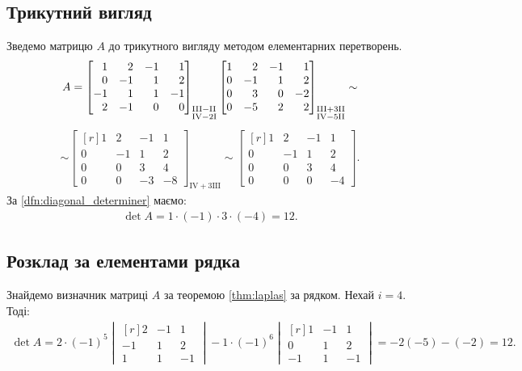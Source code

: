 \subsection{Трикутний вигляд}
\solving
Зведемо матрицю \(A\) до трикутного вигляду методом елементарних перетворень.
\begin{gather}
		A=\begin{bmatrix*}[r]
		1&2&-1&1\\
		0&-1&1&2\\
		-1&1&1&-1\\
		2&-1&0&0
	\end{bmatrix*}_{\substack{\mathrm{III-II}\hfill\\\mathrm{IV-2I}\hfill}}\begin{bmatrix*}[r]
	1&2&-1&1\\
	0&-1&1&2\\
	0&3&0&-2\\
	0&-5&2&2
\end{bmatrix*}_{\substack{\mathrm{III+3II}\hfill\\\mathrm{IV-5II}}}\sim
\end{gather}
\begin{gather}
\sim\begin{bmatrix*}[r]
1&2&-1&1\\
0&-1&1&2\\
0&0&3&4\\
0&0&-3&-8
\end{bmatrix*}_{\mathrm{IV+3III}}\sim\begin{bmatrix*}[r]
1&2&-1&1\\
0&-1&1&2\\
0&0&3&4\\
0&0&0&-4
\end{bmatrix*}.
\end{gather}
За \cref{dfn:diagonal_determiner} маємо:
\begin{gather}
	\det A =1\cdot (-1)\cdot 3\cdot (-4)=12.
\end{gather}
\subsection{Розклад за елементами рядка}
\solving
Знайдемо визначник матриці \(A\) за теоремою \ref{thm:laplas} за рядком. Нехай \(i=4\). Тоді:
\begin{gather}
	\det A = 2\cdot (-1)^5\begin{vmatrix*}[r]
		2&-1&1\\
		-1&1&2\\
		1&1&-1
	\end{vmatrix*}-1\cdot(-1)^6\begin{vmatrix*}[r]
	1&-1&1\\
	0&1&2\\
	-1&1&-1
\end{vmatrix*}=-2(-5)-(-2)=12.
\end{gather}

